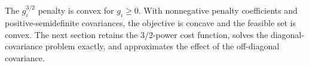 \documentclass[11pt]{gappyarticle}
\begin{document}
The $g_i^{3/2}$ penalty is convex for $g_i\geq0$. With nonnegative penalty
coefficients and positive-semidefinite covariances, the objective is concave
and the feasible set is convex. The next section retains the
$3/2$-power cost function, solves the diagonal-covariance problem exactly,
and approximates the effect of the off-diagonal covariance.
\end{document}
